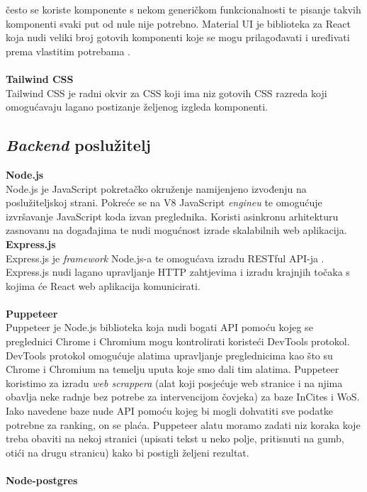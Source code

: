 \documentclass[times, utf8, zavrsni]{fer}
\begin{document}
često se koriste komponente s nekom generičkom funkcionalnosti te pisanje takvih komponenti svaki put od nule nije potrebno. 
Material UI je biblioteka za React koja nudi veliki broj gotovih komponenti koje se mogu prilagođavati i uređivati prema vlastitim potrebama .
\\
\\ \textbf{Tailwind CSS}
\\ Tailwind CSS je radni okvir  za CSS  koji ima niz gotovih CSS razreda koji omogućavaju lagano postizanje 
željenog izgleda komponenti.
\\ \subsection{\emph{Backend} poslužitelj}
\textbf{Node.js} 
\\ Node.js je JavaScript pokretačko okruženje  namijenjeno izvođenju na poslužiteljskoj strani. Pokreće se na V8 JavaScript \emph{engineu}
te omogućuje izvršavanje JavaScript koda izvan preglednika. Koristi asinkronu arhitekturu zasnovanu na događajima 
te nudi mogućnost izrade skalabilnih web aplikacija.\\\newpage \textbf{Express.js}
\\ Express.js je \emph{framework} Node.js-a te omogućava izradu RESTful API-ja . Express.js nudi
lagano upravljanje HTTP zahtjevima i izradu krajnjih točaka  s kojima će React web aplikacija komunicirati.
\\ \\ \textbf{Puppeteer}
\\ Puppeteer je Node.js biblioteka koja nudi bogati API pomoću kojeg se preglednici Chrome i Chromium mogu kontrolirati koristeći DevTools protokol.
DevTools protokol omogućuje alatima upravljanje preglednicima kao što su Chrome i Chromium na temelju uputa koje smo dali tim alatima.
Puppeteer koristimo za izradu \emph{web scrappera} (alat koji posjećuje web stranice i 
na njima obavlja neke radnje bez potrebe za intervencijom čovjeka) za baze InCites i WoS. Iako navedene baze nude API pomoću kojeg bi mogli 
dohvatiti sve podatke potrebne za ranking, on se plaća. Puppeteer alatu moramo zadati niz koraka koje treba obaviti na nekoj stranici (upisati tekst u neko polje, pritisnuti na gumb, otići na drugu stranicu)
kako bi postigli željeni rezultat.
\\ \\ \textbf{Node-postgres} 
\end{document}
